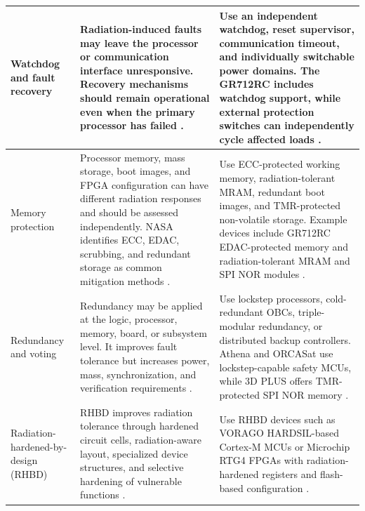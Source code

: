 \documentclass[10pt]{../datasheet}
\let\cite\citep
\begin{document}
\begin{longtable}{|p{3.5cm}|p{6.5cm}|p{6.5cm}|}
  Watchdog and fault recovery                  &
  Radiation-induced faults may leave the processor or communication interface
  unresponsive. Recovery mechanisms should remain operational even when the
  primary processor has failed
  \cite[p.~220]{nasa_soa_2022}
  \cite[p.~236]{nasa_soa_2023}
  \cite[p.~241]{nasa_soa_2024}
  \cite[pp.~219--220,222]{nasa_soa_2026}.      &
  Use an independent watchdog, reset supervisor, communication timeout, and
  individually switchable power domains. The GR712RC includes watchdog support,
  while external protection switches can independently cycle affected loads
  \cite{gaisler_gr712rc,three_d_plus_protection_switch}.                    \\ \hline

  Memory protection                            &
  Processor memory, mass storage, boot images, and FPGA configuration can have
  different radiation responses and should be assessed independently. NASA
  identifies ECC, EDAC, scrubbing, and redundant storage as common mitigation
  methods
  \cite[pp.~218--220]{nasa_soa_2022}
  \cite[pp.~234--236]{nasa_soa_2023}
  \cite[pp.~239--241]{nasa_soa_2024}
  \cite[pp.~221--224]{nasa_soa_2026}.          &
  Use ECC-protected working memory, radiation-tolerant MRAM, redundant boot
  images, and TMR-protected non-volatile storage. Example devices include
  GR712RC EDAC-protected memory and radiation-tolerant MRAM and SPI NOR modules
  \cite{gaisler_gr712rc,three_d_plus_mram,three_d_plus_spi_nor}.            \\ \hline

  Redundancy and voting                        &
  Redundancy may be applied at the logic, processor, memory, board, or subsystem
  level. It improves fault tolerance but increases power, mass, synchronization,
  and verification requirements
  \cite[p.~220]{nasa_soa_2022}
  \cite[p.~236]{nasa_soa_2023}
  \cite[p.~241]{nasa_soa_2024}
  \cite[pp.~219--222]{nasa_soa_2026}.          &
  Use lockstep processors, cold-redundant OBCs, triple-modular redundancy, or
  distributed backup controllers. Athena and ORCASat use lockstep-capable safety
  MCUs, while 3D PLUS offers TMR-protected SPI NOR memory
  \cite{athena_obc_ti_prod,orcasat_obc_ds,three_d_plus_spi_nor}.            \\ \hline

  Radiation-hardened-by-design (RHBD)          &
  RHBD improves radiation tolerance through hardened circuit cells,
  radiation-aware layout, specialized device structures, and selective
  hardening of vulnerable functions
  \cite[p.~222]{nasa_soa_2026}.                &
  Use RHBD devices such as VORAGO HARDSIL-based Cortex-M MCUs or Microchip RTG4
  FPGAs with radiation-hardened registers and flash-based configuration
  \cite{vorago_va41630,microchip_rtg4}.                                     \\ \hline


\end{longtable}
\end{document}
